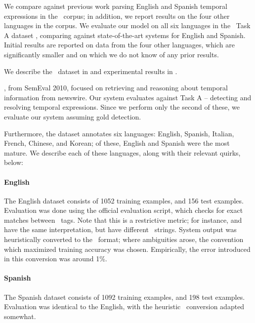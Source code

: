 We compare against previous work parsing English and Spanish temporal
  expressions in the \tempeval\ corpus; in addition, we report results on
  the four other languages in the corpus.
We evaluate our model on all six languages in the \tempeval\ Task A dataset
  \cite{key:2010verhagen-tempeval}, comparing against state-of-the-art
  systems for English and Spanish.
Initial results are reported on data from the four other languages,
  which are significantly smaller and on which we do not know of any prior
  results.

We describe the \tempeval\ dataset in  and experimental
  results in .

\tempeval, from SemEval 2010, focused on retrieving and reasoning
  about temporal information from newswire.
Our system evaluates against Task A -- detecting and resolving temporal
  expressions.
Since we perform only the second of these, we evaluate our system
	assuming gold detection.

Furthermore, the dataset annotates six languages:
  English, Spanish, Italian, French, Chinese, and Korean;
  of these, English and Spanish were the most mature.
We describe each of these languages, along with their relevant quirks, below:

\paragraph{English}
The English dataset consists of 1052 training examples, and 156 test examples.
Evaluation was done using the official evaluation script, which checks for
  exact matches between \timex\ tags.
Note that this is a restrictive metric; for instance,  and
   have the same interpretation, but
  have different \timex\ strings.
System output was heuristically converted to the \timex\ format; where
  ambiguities arose, the convention which maximized training accuracy was
  chosen.
Empirically, the error introduced in this conversion was around 1\%.

\paragraph{Spanish}
The Spanish dataset consists of 1092 training examples, and 198 test examples.
Evaluation was identical to the English, with the heuristic \timex\ conversion
  adapted somewhat.

